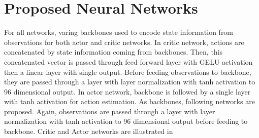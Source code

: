 \section{Proposed Neural Networks}
For all networks, varing backbones used to encode state information from observations for both actor and critic networks. In critic network, actions are concatenated by state information coming from backbones. Then, this concatenated vector is passed through feed forward layer with GELU activation then a linear layer with single output. Before feeding observations to backbone, they are passed through a layer with layer normalization with tanh activation to 96 dimensional output. In actor network, backbone is followed by a single layer with tanh activation for action estimation. As backbones, following networks are proposed. Again, observations are passed through a layer with layer normalization with tanh activation to 96 dimensional output before feeding to backbone. Critic and Actor networks are illustrated in  \\
